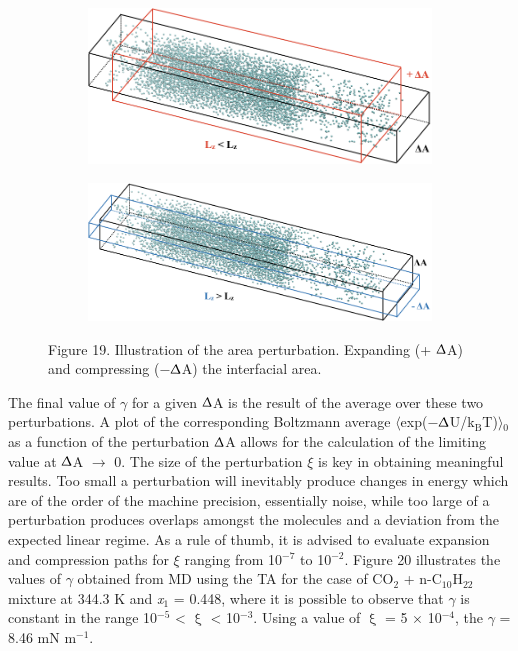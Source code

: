 \documentclass{scrbook}
\begin{document}
\begin{figure}
  \centering
	\begin{subfigure}{0.4\textwidth} %
    \includegraphics[width=1\textwidth]{gfx/image64.png}
	\end{subfigure}
	\begin{subfigure}{0.4\textwidth} %
    \includegraphics[width=1\textwidth]{gfx/image65.png}
	\end{subfigure}
\caption{Figure 19. Illustration of the area perturbation. Expanding (+ {${\Updelta}$}A) and compressing (${-}${${\Updelta}$}A) the interfacial area.}
\label{fig:19}
\end{figure}

The final value of {${\gamma}$} for a given {\textbar}{${\Updelta}$}A{\textbar}
is the result of the average over these two perturbations. A plot of the
corresponding Boltzmann average
${\langle}$exp(${-}${${\Updelta}$}U/k$_{\mathrm{B}}$T)${\rangle}$$_{0}$ as
a function of the perturbation {\textbar}{${\Updelta}$}A{\textbar} allows for
the calculation of the limiting value at {${\Updelta}$}A ${\rightarrow}$ 0. The
size of the perturbation {${\xi}$} is key in obtaining meaningful results. Too
small a perturbation will inevitably produce changes in energy which are of the
order of the machine precision, essentially noise, while too large of
a perturbation produces overlaps amongst the molecules and a deviation from the
expected linear regime. As a rule of thumb, it is advised to evaluate expansion
and compression paths for {${\xi}$} ranging from 10$^{{-}7}$ to 10$^{{-}2}$.
Figure 20 illustrates the values of {${\gamma}$} obtained from MD using the TA
for the case of CO$_{2}$ + n-C$_{10}$H$_{22}$ mixture at 344.3 K and
\textit{x}$_{1}$ = 0.448, where it is possible to observe that {${\gamma}$} is
constant in the range 10$^{-5}$ {\textless} {${\upxi}$} {\textless} 10$^{-3}$.
Using a value of {${\upxi}$} = 5 ${\times}$ 10$^{-4}$, the {${\gamma}$} = 8.46
mN m$^{-1}$.\citep{muller2009} 
\end{document}
